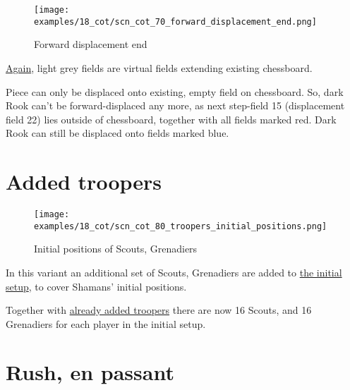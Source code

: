 \noindent
\begin{figure}[!h]
\texttt{[image: examples/18\_cot/scn\_cot\_70\_forward\_displacement\_end.png]}
\caption{Forward displacement end}
\label{fig:scn_cot_70_forward_displacement_end}
\end{figure}

\hyperref[fig:scn_hd_06_centaur_off_board]{Again},
light grey fields are virtual fields extending existing chessboard.

Piece can only be displaced onto existing, empty field on chessboard. So, dark Rook
can't be forward-displaced any more, as next step-field 15 (displacement field 22)
lies outside of chessboard, together with all fields marked red. Dark Rook can still
be displaced onto fields marked blue.

\clearpage %

\section*{Added troopers}
\label{sec:Conquest of Tlalocan/Added troopers}

\vspace*{-1.2\baselineskip}
\noindent
\begin{figure}[!h]
\texttt{[image: examples/18\_cot/scn\_cot\_80\_troopers\_initial\_positions.png]}
\caption{Initial positions of Scouts, Grenadiers}
\label{fig:scn_cot_80_troopers_initial_positions}
\end{figure}

In this variant an additional set of Scouts, Grenadiers are added to
\hyperref[fig:18_conquest_of_tlalocan]{the initial setup},
to cover Shamans' initial positions.

Together with
\hyperref[fig:14_hemera_s_dawn]{already added troopers} there are now
16 Scouts, and 16 Grenadiers for each player in the initial setup.

\clearpage %

\section*{Rush, en passant}
\label{sec:Conquest of Tlalocan/Rush, en passant}

